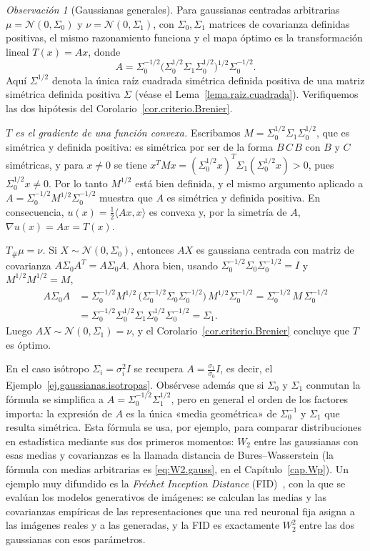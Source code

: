 \documentclass[12pt, a4paper]{amsbook}
\theoremstyle{remark}
\newtheorem{obs}[teo]{Observación}
\theoremstyle{definition}
\numberwithin{section}{chapter}
\numberwithin{subsection}{section}
\numberwithin{equation}{section}
\numberwithin{figure}{chapter}
\begin{document}
\begin{obs}[Gaussianas generales]\label{obs.gaussianas.generales}
Para gaussianas centradas arbitrarias $\mu=\mathcal N(0,\Sigma_0)$ y
$\nu=\mathcal N(0,\Sigma_1)$, con $\Sigma_0,\Sigma_1$ matrices de covarianza
definidas positivas, el mismo razonamiento funciona y el mapa óptimo es la
transformación lineal $T(x)=Ax$, donde
\[
A
=
\Sigma_0^{-1/2}
\bigl(\Sigma_0^{1/2}\Sigma_1\Sigma_0^{1/2}\bigr)^{1/2}
\Sigma_0^{-1/2}.
\]
Aquí $\Sigma^{1/2}$ denota la única raíz cuadrada simétrica definida positiva
de una matriz simétrica definida positiva $\Sigma$ (véase el
Lema~\ref{lema.raiz.cuadrada}). Verifiquemos las dos hipótesis del
Corolario~\ref{cor.criterio.Brenier}.

\medskip
\textit{$T$ es el gradiente de una función convexa.}
Escribamos $M=\Sigma_0^{1/2}\Sigma_1\Sigma_0^{1/2}$, que es simétrica y
definida positiva: es simétrica por ser de la forma $B\,C\,B$ con $B$ y $C$
simétricas, y para $x\neq0$ se tiene
$x^TMx=(\Sigma_0^{1/2}x)^T\Sigma_1(\Sigma_0^{1/2}x)>0$, pues
$\Sigma_0^{1/2}x\neq0$. Por lo tanto $M^{1/2}$ está bien definida, y el mismo
argumento aplicado a $A=\Sigma_0^{-1/2}M^{1/2}\Sigma_0^{-1/2}$ muestra que $A$
es simétrica y definida positiva. En consecuencia,
$u(x)=\tfrac12\langle Ax,x\rangle$ es convexa y, por la simetría de $A$,
$\nabla u(x)=Ax=T(x)$.

\medskip
\textit{$T_\#\mu=\nu$.}
Si $X\sim\mathcal N(0,\Sigma_0)$, entonces $AX$ es gaussiana centrada con
matriz de covarianza $A\Sigma_0A^T=A\Sigma_0A$. Ahora bien, usando
$\Sigma_0^{-1/2}\Sigma_0\Sigma_0^{-1/2}=I$ y $M^{1/2}M^{1/2}=M$,
\begin{align*}
A\Sigma_0A
&=\Sigma_0^{-1/2}M^{1/2}\,\bigl(\Sigma_0^{-1/2}\Sigma_0\Sigma_0^{-1/2}\bigr)\,M^{1/2}\Sigma_0^{-1/2}
=\Sigma_0^{-1/2}\,M\,\Sigma_0^{-1/2}\\
&=\Sigma_0^{-1/2}\Sigma_0^{1/2}\Sigma_1\Sigma_0^{1/2}\Sigma_0^{-1/2}
=\Sigma_1 .
\end{align*}
Luego $AX\sim\mathcal N(0,\Sigma_1)=\nu$, y el
Corolario~\ref{cor.criterio.Brenier} concluye que $T$ es óptimo.

\medskip
En el caso isótropo $\Sigma_i=\sigma_i^2I$ se recupera
$A=\tfrac{\sigma_1}{\sigma_0}I$, es decir, el Ejemplo~\ref{ej.gaussianas.isotropas}.
Obsérvese además que si $\Sigma_0$ y $\Sigma_1$ conmutan la fórmula se
simplifica a $A=\Sigma_0^{-1/2}\Sigma_1^{1/2}$, pero en general el orden de
los factores importa: la expresión de $A$ es la única «media geométrica» de
$\Sigma_0^{-1}$ y $\Sigma_1$ que resulta simétrica. Esta fórmula se usa, por ejemplo, para comparar distribuciones
en estadística mediante sus dos primeros momentos: $W_2$ entre las gaussianas
con esas medias y covarianzas es la llamada distancia de Bures--Wasserstein
(la fórmula con medias arbitrarias es \eqref{eq:W2.gauss}, en el
Capítulo~\ref{cap.Wp}). Un ejemplo muy difundido es la \emph{Fréchet
Inception Distance} (FID)~\cite{Heusel2017}, con la que se evalúan los
modelos generativos de imágenes: se calculan las medias y las covarianzas
empíricas de las representaciones que una red neuronal fija asigna a las
imágenes reales y a las generadas, y la FID es exactamente $W_2^2$ entre las
dos gaussianas con esos parámetros.
\end{obs}
\end{document}
